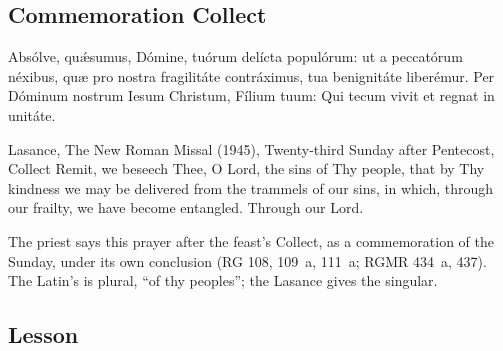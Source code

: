 \subsection{Commemoration Collect}
\label{proper-commemoration-collect}


\begin{latinproper}
Absólve, quǽsumus, Dómine, tuórum delícta populórum: ut a peccatórum
néxibus, quæ pro nostra fragilitáte contráximus, tua benignitáte liberémur.
Per Dóminum nostrum Iesum Christum, Fílium tuum: Qui tecum vivit et regnat
in unitáte.
\end{latinproper}

\begin{englishwitness}{Lasance, The New Roman Missal (1945), Twenty-third Sunday after Pentecost, Collect}
Remit, we beseech Thee, O Lord, the sins of Thy people, that by Thy kindness
we may be delivered from the trammels of our sins, in which, through our
frailty, we have become entangled. Through our Lord.
\end{englishwitness}

\noindent The priest says this prayer after the feast's Collect, as a
commemoration of the Sunday, under its own conclusion (RG 108, 109~a, 111~a;
RGMR 434~a, 437). The Latin's  is plural, ``of thy peoples'';
the Lasance gives the singular.

\subsection{Lesson}
\label{proper-lesson}


